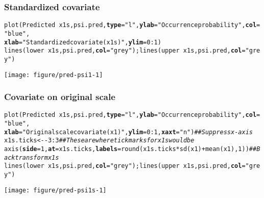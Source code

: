 \documentclass[color=usenames,dvipsnames]{beamer}\usepackage[]{graphicx}\usepackage[]{color}
\makeatletter
\newcommand{\hlnum}[1]{\textcolor[rgb]{0.69,0.494,0}{#1}}%
\newcommand{\hlstr}[1]{\textcolor[rgb]{0.749,0.012,0.012}{#1}}%
\newcommand{\hlcom}[1]{\textcolor[rgb]{0.514,0.506,0.514}{\textit{#1}}}%
\newcommand{\hlopt}[1]{\textcolor[rgb]{0,0,0}{#1}}%
\newcommand{\hlstd}[1]{\textcolor[rgb]{0,0,0}{#1}}%
\newcommand{\hlkwb}[1]{\textcolor[rgb]{0,0.341,0.682}{#1}}%
\newcommand{\hlkwc}[1]{\textcolor[rgb]{0,0,0}{\textbf{#1}}}%
\newcommand{\hlkwd}[1]{\textcolor[rgb]{0.004,0.004,0.506}{#1}}%
\newenvironment{kframe}{%
 \def\at@end@of@kframe{}%
 \ifinner\ifhmode%
  \def\at@end@of@kframe{\end{minipage}}%
  \begin{minipage}{\columnwidth}%
 \fi\fi%
 \def\FrameCommand##1{\hskip\@totalleftmargin \hskip-\fboxsep
 \colorbox{shadecolor}{##1}\hskip-\fboxsep
     \hskip-\linewidth \hskip-\@totalleftmargin \hskip\columnwidth}%
 \MakeFramed {\advance\hsize-\width
   \@totalleftmargin\z@ \linewidth\hsize
   \@setminipage}}%
 {\par\unskip\endMakeFramed%
 \at@end@of@kframe}
\newenvironment{knitrout}{}{} %
\makeatother
\begin{document}
\begin{frame}[fragile]
  \frametitle{Standardized covariate}
\begin{knitrout}\tiny
{}\color{fgcolor}\begin{kframe}
\begin{alltt}
\hlkwd{plot}\hlstd{(Predicted} \hlopt{~} \hlstd{x1s, psi.pred,} \hlkwc{type}\hlstd{=}\hlstr{"l"}\hlstd{,} \hlkwc{ylab}\hlstd{=}\hlstr{"Occurrence probability"}\hlstd{,} \hlkwc{col}\hlstd{=}\hlstr{"blue"}\hlstd{,}
     \hlkwc{xlab}\hlstd{=}\hlstr{"Standardized covariate (x1s)"}\hlstd{,} \hlkwc{ylim}\hlstd{=}\hlnum{0}\hlopt{:}\hlnum{1}\hlstd{)}
\hlkwd{lines}\hlstd{(lower} \hlopt{~} \hlstd{x1s, psi.pred,} \hlkwc{col}\hlstd{=}\hlstr{"grey"}\hlstd{);} \hlkwd{lines}\hlstd{(upper} \hlopt{~} \hlstd{x1s, psi.pred,} \hlkwc{col}\hlstd{=}\hlstr{"grey"}\hlstd{)}
\end{alltt}
\end{kframe}

{\centering \texttt{[image: figure/pred-psi1-1]} 

}


\end{knitrout}
\end{frame}




\begin{frame}[fragile]
  \frametitle{Covariate on original scale}
\begin{knitrout}\tiny
{}\color{fgcolor}\begin{kframe}
\begin{alltt}
\hlkwd{plot}\hlstd{(Predicted} \hlopt{~} \hlstd{x1s, psi.pred,} \hlkwc{type}\hlstd{=}\hlstr{"l"}\hlstd{,} \hlkwc{ylab}\hlstd{=}\hlstr{"Occurrence probability"}\hlstd{,} \hlkwc{col}\hlstd{=}\hlstr{"blue"}\hlstd{,}
     \hlkwc{xlab}\hlstd{=}\hlstr{"Original scale covariate (x1)"}\hlstd{,} \hlkwc{ylim}\hlstd{=}\hlnum{0}\hlopt{:}\hlnum{1}\hlstd{,} \hlkwc{xaxt}\hlstd{=}\hlstr{"n"}\hlstd{)} \hlcom{## Suppress x-axis}
\hlstd{x1s.ticks} \hlkwb{<-} \hlopt{-}\hlnum{3}\hlopt{:}\hlnum{3}  \hlcom{## These are where tick marks for x1s would be}
\hlkwd{axis}\hlstd{(}\hlkwc{side}\hlstd{=}\hlnum{1}\hlstd{,} \hlkwc{at}\hlstd{=x1s.ticks,} \hlkwc{labels}\hlstd{=}\hlkwd{round}\hlstd{(x1s.ticks}\hlopt{*}\hlkwd{sd}\hlstd{(x1)}\hlopt{+}\hlkwd{mean}\hlstd{(x1),}\hlnum{1}\hlstd{))} \hlcom{## Backtransform x1s}
\hlkwd{lines}\hlstd{(lower} \hlopt{~} \hlstd{x1s, psi.pred,} \hlkwc{col}\hlstd{=}\hlstr{"grey"}\hlstd{);} \hlkwd{lines}\hlstd{(upper} \hlopt{~} \hlstd{x1s, psi.pred,} \hlkwc{col}\hlstd{=}\hlstr{"grey"}\hlstd{)}
\end{alltt}
\end{kframe}

{\centering \texttt{[image: figure/pred-psi1s-1]} 

}


\end{knitrout}
\end{frame}
\end{document}
